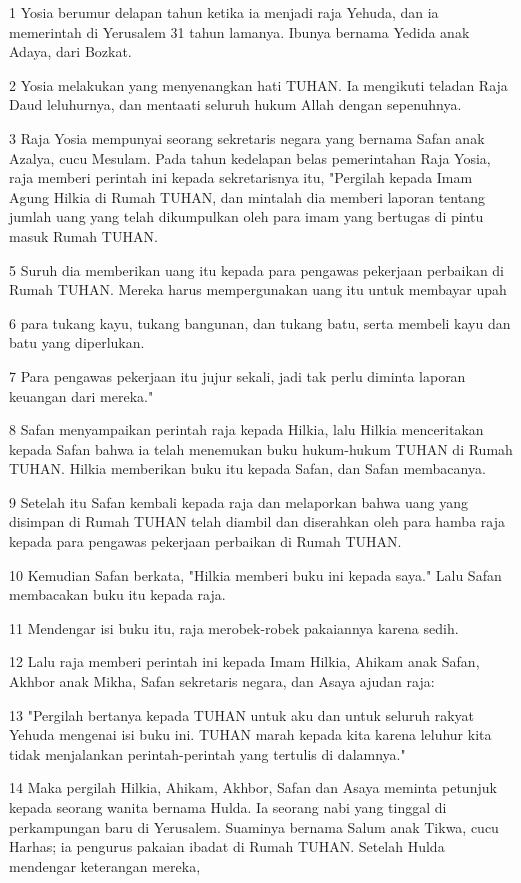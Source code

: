 \par 1 Yosia berumur delapan tahun ketika ia menjadi raja Yehuda, dan ia memerintah di Yerusalem 31 tahun lamanya. Ibunya bernama Yedida anak Adaya, dari Bozkat.
\par 2 Yosia melakukan yang menyenangkan hati TUHAN. Ia mengikuti teladan Raja Daud leluhurnya, dan mentaati seluruh hukum Allah dengan sepenuhnya.
\par 3 Raja Yosia mempunyai seorang sekretaris negara yang bernama Safan anak Azalya, cucu Mesulam. Pada tahun kedelapan belas pemerintahan Raja Yosia, raja memberi perintah ini kepada sekretarisnya itu, "Pergilah kepada Imam Agung Hilkia di Rumah TUHAN, dan mintalah dia memberi laporan tentang jumlah uang yang telah dikumpulkan oleh para imam yang bertugas di pintu masuk Rumah TUHAN.
\par 5 Suruh dia memberikan uang itu kepada para pengawas pekerjaan perbaikan di Rumah TUHAN. Mereka harus mempergunakan uang itu untuk membayar upah
\par 6 para tukang kayu, tukang bangunan, dan tukang batu, serta membeli kayu dan batu yang diperlukan.
\par 7 Para pengawas pekerjaan itu jujur sekali, jadi tak perlu diminta laporan keuangan dari mereka."
\par 8 Safan menyampaikan perintah raja kepada Hilkia, lalu Hilkia menceritakan kepada Safan bahwa ia telah menemukan buku hukum-hukum TUHAN di Rumah TUHAN. Hilkia memberikan buku itu kepada Safan, dan Safan membacanya.
\par 9 Setelah itu Safan kembali kepada raja dan melaporkan bahwa uang yang disimpan di Rumah TUHAN telah diambil dan diserahkan oleh para hamba raja kepada para pengawas pekerjaan perbaikan di Rumah TUHAN.
\par 10 Kemudian Safan berkata, "Hilkia memberi buku ini kepada saya." Lalu Safan membacakan buku itu kepada raja.
\par 11 Mendengar isi buku itu, raja merobek-robek pakaiannya karena sedih.
\par 12 Lalu raja memberi perintah ini kepada Imam Hilkia, Ahikam anak Safan, Akhbor anak Mikha, Safan sekretaris negara, dan Asaya ajudan raja:
\par 13 "Pergilah bertanya kepada TUHAN untuk aku dan untuk seluruh rakyat Yehuda mengenai isi buku ini. TUHAN marah kepada kita karena leluhur kita tidak menjalankan perintah-perintah yang tertulis di dalamnya."
\par 14 Maka pergilah Hilkia, Ahikam, Akhbor, Safan dan Asaya meminta petunjuk kepada seorang wanita bernama Hulda. Ia seorang nabi yang tinggal di perkampungan baru di Yerusalem. Suaminya bernama Salum anak Tikwa, cucu Harhas; ia pengurus pakaian ibadat di Rumah TUHAN. Setelah Hulda mendengar keterangan mereka,
